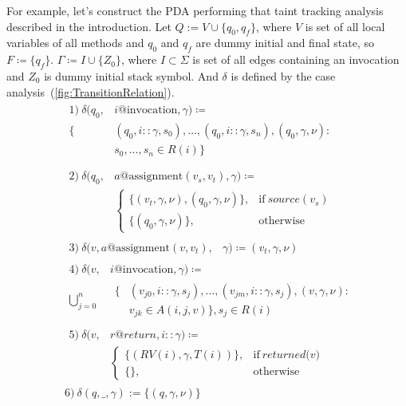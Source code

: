 For example, let's construct the PDA performing that taint tracking analysis described in the introduction.
Let $Q := V \cup \{q_0, q_f\}$, where $V$ is set of all local variables of all methods and $q_0$ and $q_f$ are dummy initial and final state, so $F \coloneqq \{q_f\}$.
$\Gamma \coloneqq I \cup \{Z_0\}$, where $I \subset \Sigma$ is set of all edges containing an invocation and $Z_0$ is dummy initial stack symbol.
And $\delta$ is defined by the case analysis~(\ref{fig:TransitionRelation}).
\begin{equation}
	\label{fig:TransitionRelation}
	\begin{split}
		&\begin{split}
			1)\ \delta(q_0, & i@\textrm{invocation}, \gamma) \coloneqq \\
			\{& (q_0, i::\gamma, s_0), \ldots, (q_0, i::\gamma, s_n), (q_0, \gamma, \nu): \\
			& s_0, \ldots, s_n \in R(i)\} \\
		\end{split} \\
		&\begin{split}
			2)\ \delta(q_0, & a@\textrm{assignment} (v_s, v_t), \gamma) \coloneqq \\
			&\begin{cases}
				\{(v_t, \gamma, \nu), (q_0, \gamma, \nu)\},& \textrm{if}\ \textit{source}(v_s) \\
				\{(q_0, \gamma, \nu)\},& \textrm{otherwise}
			\end{cases}
		\end{split} \\
		&\begin{split}
			3)\ \delta(v, a@\textrm{assignment}(v, v_t), & \gamma) \coloneqq {(v_t, \gamma, \nu)}
		\end{split} \\
		&\begin{split}
			4)\ \delta(v, & i@\textrm{invocation}, \gamma) \coloneqq \\
			\bigcup_{j=0}^{n} 
			&\begin{split}
				\{&(v_{j0}, i::\gamma, s_j), \ldots, (v_{jm}, i::\gamma, s_j), (v, \gamma, \nu): \\
				& v_{jk} \in A(i, j, v)\}, s_j \in R(i)
			\end{split}
		\end{split} \\
		&\begin{split}
			5)\ \delta(v, & r@return, i::\gamma) \coloneqq \\
			&\begin{cases}
				\{(RV(i), \gamma, T(i))\},& \textrm{if}\ \textit{returned(v)} \\
				\{\}, & \textrm{otherwise}
			\end{cases}
		\end{split} \\
		& 6)\ \delta(q, \_, \gamma) := \{(q, \gamma, \nu)\}
	\end{split}
\end{equation}
